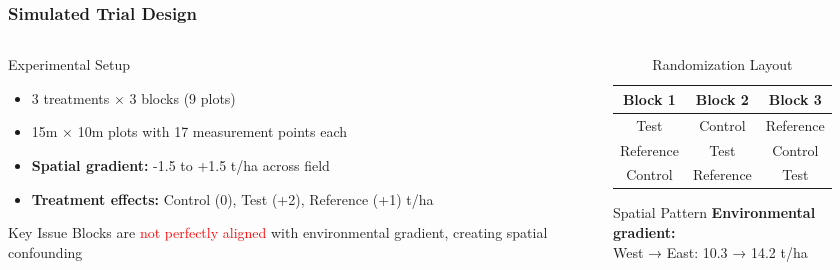 \begin{frame}
    \frametitle{Simulated Trial Design}
    
    \begin{columns}[T]
        \begin{column}{0.6\textwidth}
            \begin{block}{Experimental Setup}
                \begin{itemize}
                    \item 3 treatments × 3 blocks (9 plots)
                    \item 15m × 10m plots with 17 measurement points each
                    \item \textbf{Spatial gradient:} -1.5 to +1.5 t/ha across field
                    \item \textbf{Treatment effects:} Control (0), Test (+2), Reference (+1) t/ha
                \end{itemize}
            \end{block}
            
            \begin{block}{Key Issue}
                Blocks are \textcolor{red}{not perfectly aligned} with environmental gradient, creating spatial confounding
            \end{block}
        \end{column}
        
        \begin{column}{0.4\textwidth}
            \begin{table}[h]
                \centering
                \scriptsize
                \begin{tabular}{|c|c|c|}
                    \hline
                    \rowcolor{lightblue} \textbf{Block 1} & \textbf{Block 2} & \textbf{Block 3} \\
                    \hline
                    Test & Control & Reference \\
                    Reference & Test & Control \\
                    Control & Reference & Test \\
                    \hline
                \end{tabular}
                \caption{Randomization Layout}
            \end{table}
            
            \vspace{0.5em}
            
            \begin{block}{Spatial Pattern}
                \small
                \textbf{Environmental gradient:}\\
                West → East: 10.3 → 14.2 t/ha
            \end{block}
        \end{column}
    \end{columns}
\end{frame}

